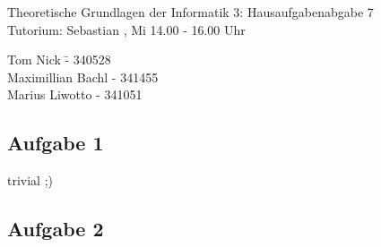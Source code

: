 \documentclass[a4paper,10pt]{article}
\begin{document}
\begin{center}
\Large{Theoretische Grundlagen der Informatik 3: Hausaufgabenabgabe 7} \\
\large{Tutorium: Sebastian , Mi 14.00 - 16.00 Uhr}
\end{center}
\begin{tabbing}
Tom Nick \hspace{2cm}\= - 340528\\
Maximillian Bachl \> - 341455 \\
Marius Liwotto\> -  341051
\end{tabbing}
\subsection*{Aufgabe 1}
trivial ;)

\subsection*{Aufgabe 2}
\end{document}
